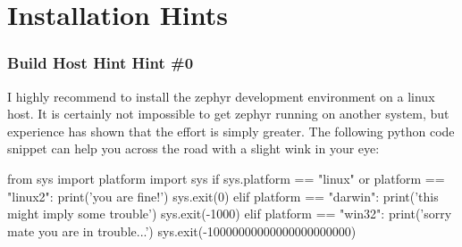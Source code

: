 \chapter{Installation Hints}

\subsection{Build Host Hint Hint \#0} \label{hint0}

I highly recommend to install the zephyr development environment on a linux host. It is certainly not impossible to get zephyr running on another system, but experience has shown that the effort is simply greater. The following python code snippet can help you across the road with a slight wink in your eye:

\begin{pythonbox}

from sys import platform
import sys
if sys.platform == "linux" or platform == "linux2":
    print('you are fine!')
    sys.exit(0)
elif platform == "darwin":          
    print('this might imply some trouble')
    sys.exit(-1000)
elif platform == "win32":             
    print('sorry mate you are in trouble...')
    sys.exit(-10000000000000000000000)
\end{pythonbox}

